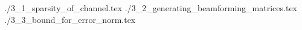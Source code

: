 \startchapter [title={Error analysis}]

 {./3_1_sparsity_of_channel.tex}
 {./3_2_generating_beamforming_matrices.tex}
 {./3_3_bound_for_error_norm.tex}

\stopchapter
